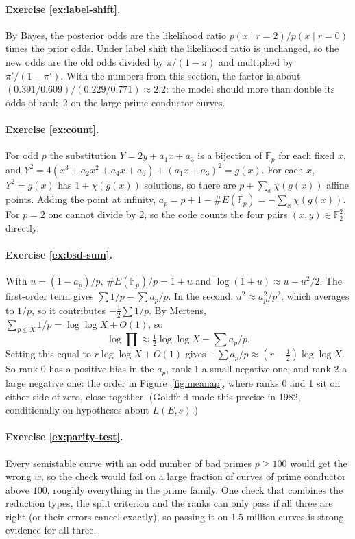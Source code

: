 \documentclass[11pt]{article}
\theoremstyle{definition}
\theoremstyle{plain}
\theoremstyle{remark}
\newcommand{\F}{\mathbb{F}}
\renewcommand{\_}{\oldunderscore\allowbreak}
\begin{document}
\paragraph{Exercise \ref{ex:label-shift}.}
By Bayes, the posterior odds are the likelihood ratio $p(x\mid r=2)/p(x\mid r=0)$ times the
prior odds. Under label shift the likelihood ratio is unchanged, so the new odds are the old
odds divided by $\pi/(1-\pi)$ and multiplied by $\pi'/(1-\pi')$. With the numbers from this
section, the factor is about $(0.391/0.609)/(0.229/0.771)\approx2.2$: the model should more than
double its odds of rank~2 on the large prime-conductor curves.

\paragraph{Exercise \ref{ex:count}.}
For odd $p$ the substitution $Y=2y+a_1x+a_3$ is a bijection of $\F_p$ for each fixed $x$, and
$Y^2=4(x^3+a_2x^2+a_4x+a_6)+(a_1x+a_3)^2=g(x)$. For each $x$, $Y^2=g(x)$ has $1+\chi(g(x))$
solutions, so there are $p+\sum_x\chi(g(x))$ affine points. Adding the point at infinity,
$a_p=p+1-\#E(\F_p)=-\sum_x\chi(g(x))$. For $p=2$ one cannot divide by $2$, so the code counts the
four pairs $(x,y)\in\F_2^2$ directly.

\paragraph{Exercise \ref{ex:bsd-sum}.}
With $u=(1-a_p)/p$, $\#E(\F_p)/p=1+u$ and $\log(1+u)\approx u-u^2/2$. The first-order term gives
$\sum1/p-\sum a_p/p$. In the second, $u^2\approx a_p^2/p^2$, which averages to $1/p$, so it
contributes $-\tfrac12\sum1/p$. By Mertens, $\sum_{p\le X}1/p=\log\log X+O(1)$, so
\[
  \log\prod\approx\tfrac12\log\log X-\sum a_p/p .
\]
Setting this equal to $r\log\log X+O(1)$ gives $-\sum a_p/p\approx(r-\tfrac12)\log\log X$. So
rank $0$ has a positive bias in the $a_p$, rank $1$ a small negative one, and rank $2$ a large
negative one: the order in Figure~\ref{fig:meanap}, where ranks 0 and 1 sit on either side of
zero, close together. (Goldfeld made this precise in 1982, conditionally on hypotheses
about $L(E,s)$.)

\paragraph{Exercise \ref{ex:parity-test}.}
Every semistable curve with an odd number of bad primes $p\ge100$ would get the wrong $w$, so
the check would fail on a large fraction of curves of prime conductor above $100$, roughly
everything in the prime family. One check that combines the reduction types, the split
criterion and the ranks can only pass if all three are right (or their errors cancel
exactly), so passing it on 1.5 million curves is strong evidence for all three.
\end{document}
